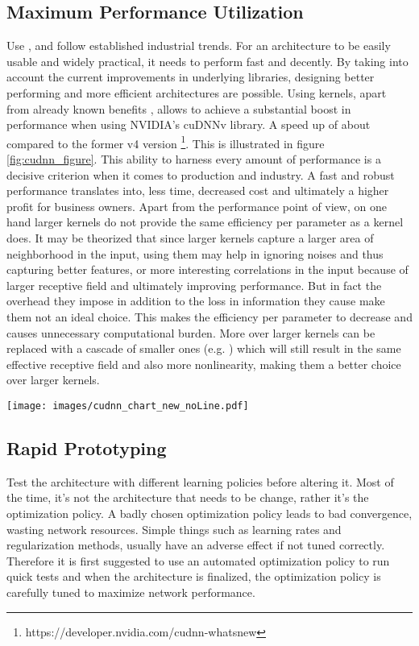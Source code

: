 \documentclass{article} \usepackage{lets_keepit_simple,times}
\begin{document}
\subsection{Maximum Performance Utilization}
Use , and follow established industrial trends. For an architecture to be easily usable and widely practical, it needs to perform fast and decently. By taking into account the current improvements in underlying libraries, designing better performing and more efficient architectures are possible. Using  kernels, apart from already known benefits \cite{Simonyan_VGG_2014}, allows to achieve a substantial boost in performance when using NVIDIA's cuDNNv library. A speed up of about  compared to the former v4 version \footnote{https://developer.nvidia.com/cudnn-whatsnew}. This is illustrated in figure \ref{fig:cudnn_figure}. This ability to harness every amount of performance is a decisive criterion when it comes to production and industry. A fast and robust performance translates into, less time, decreased cost and ultimately a higher profit for business owners. Apart from the performance point of view, on one hand larger kernels do not provide the same efficiency per parameter as a  kernel does. It may be theorized that since larger kernels capture a larger area of neighborhood in the input, using them may help in ignoring noises and thus capturing better features, or more interesting correlations in the input because of larger receptive field and ultimately improving performance. But in fact the overhead they impose in addition to the loss in information they cause make them not an ideal choice. This makes the efficiency per parameter to decrease and causes unnecessary computational burden. More over larger kernels can be replaced with a cascade of smaller ones (e.g. ) which will still result in the same effective receptive field and also more nonlinearity, making them a better choice over larger kernels. 

\begin{figure*}[h]
\begin{center}
\texttt{[image: images/cudnn\_chart\_new\_noLine.pdf]}
\end{center}
 \caption{Using  kernels results in  faster training when using cuDNNv}
\label{fig:cudnn_figure}
\end{figure*}
\subsection{Rapid Prototyping}
Test the architecture with different learning policies before altering it. Most of the time, it's not the architecture that needs to be change, rather it's the optimization policy. A badly chosen optimization policy leads to bad convergence, wasting network resources. Simple things such as learning rates and regularization methods, usually have an adverse effect if not tuned correctly. Therefore it is first suggested to use an automated optimization policy to run quick tests and when the architecture is finalized, the optimization policy is carefully tuned to maximize network performance.
\end{document}
